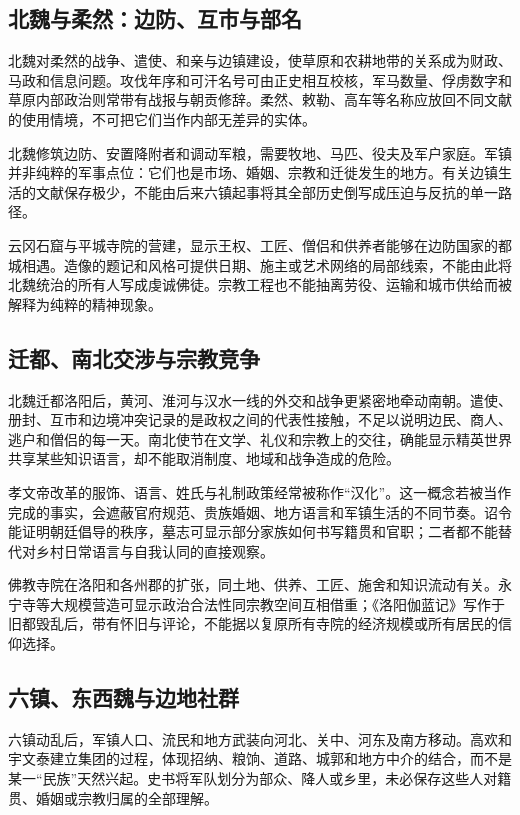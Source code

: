 \subsection{北魏与柔然：边防、互市与部名}

北魏对柔然的战争、遣使、和亲与边镇建设，使草原和农耕地带的关系成为财政、马政和信息问题。攻伐年序和可汗名号可由正史相互校核，军马数量、俘虏数字和草原内部政治则常带有战报与朝贡修辞。柔然、敕勒、高车等名称应放回不同文献的使用情境，不可把它们当作内部无差异的实体。

北魏修筑边防、安置降附者和调动军粮，需要牧地、马匹、役夫及军户家庭。军镇并非纯粹的军事点位：它们也是市场、婚姻、宗教和迁徙发生的地方。有关边镇生活的文献保存极少，不能由后来六镇起事将其全部历史倒写成压迫与反抗的单一路径。

云冈石窟与平城寺院的营建，显示王权、工匠、僧侣和供养者能够在边防国家的都城相遇。造像的题记和风格可提供日期、施主或艺术网络的局部线索，不能由此将北魏统治的所有人写成虔诚佛徒。宗教工程也不能抽离劳役、运输和城市供给而被解释为纯粹的精神现象。

\subsection{迁都、南北交涉与宗教竞争}

北魏迁都洛阳后，黄河、淮河与汉水一线的外交和战争更紧密地牵动南朝。遣使、册封、互市和边境冲突记录的是政权之间的代表性接触，不足以说明边民、商人、逃户和僧侣的每一天。南北使节在文学、礼仪和宗教上的交往，确能显示精英世界共享某些知识语言，却不能取消制度、地域和战争造成的危险。

孝文帝改革的服饰、语言、姓氏与礼制政策经常被称作“汉化”。这一概念若被当作完成的事实，会遮蔽官府规范、贵族婚姻、地方语言和军镇生活的不同节奏。诏令能证明朝廷倡导的秩序，墓志可显示部分家族如何书写籍贯和官职；二者都不能替代对乡村日常语言与自我认同的直接观察。

佛教寺院在洛阳和各州郡的扩张，同土地、供养、工匠、施舍和知识流动有关。永宁寺等大规模营造可显示政治合法性同宗教空间互相借重；《洛阳伽蓝记》写作于旧都毁乱后，带有怀旧与评论，不能据以复原所有寺院的经济规模或所有居民的信仰选择。

\subsection{六镇、东西魏与边地社群}

六镇动乱后，军镇人口、流民和地方武装向河北、关中、河东及南方移动。高欢和宇文泰建立集团的过程，体现招纳、粮饷、道路、城郭和地方中介的结合，而不是某一“民族”天然兴起。史书将军队划分为部众、降人或乡里，未必保存这些人对籍贯、婚姻或宗教归属的全部理解。

